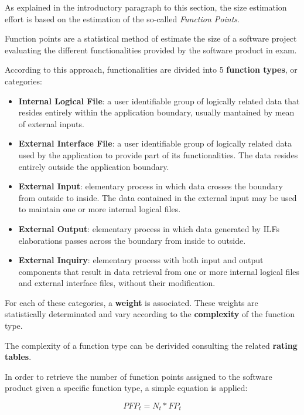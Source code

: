 As explained in the introductory paragraph to this section, the size estimation effort is based on the estimation of the so-called \textit{Function Points}.

Function points are a statistical method of estimate the size of a software project evaluating the different functionalities provided by the software product in exam.

According to this approach, functionalities are divided into 5 \textbf{function types}, or categories:

\begin{itemize}
	\item \textbf{Internal Logical File}: a user identifiable group of logically related data that resides entirely within the application boundary, usually mantained by mean of external inputs.
	\item \textbf{External Interface File}: a user identifiable group of logically related data used by the application to provide part of its functionalities. The data resides entirely outside the application boundary. 
	\item \textbf{External Input}: elementary process in which data crosses the boundary from outside to inside. The data contained in the external input may be used to maintain one or more internal logical files.
	\item \textbf{External Output}: elementary process in which data generated by ILFs elaborations passes across the boundary from inside to outside.
	\item \textbf{External Inquiry}: elementary process with both input and output components that result in data retrieval from one or more internal logical files and external interface files, without their modification.
\end{itemize}

For each of these categories, a \textbf{weight} is associated. These weights are statistically determinated and vary according to the \textbf{complexity} of the function type.

The complexity of a function type can be derivided consulting the related \textbf{rating tables}.

In order to retrieve the number of function points assigned to the software product given a specific function type, a simple equation is applied:

\begin{equation}
	\label{eq:PFP}
	PFP_t = N_t * FP_t
\end{equation}

